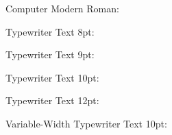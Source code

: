 \documentclass[10pt,a4paper]{article}
\newcommand{\Ligature}{%

}
\begin{document}
Computer Modern Roman:\\{\Ligature}

Typewriter Text 8pt:\\{\oltteight \Ligature}

Typewriter Text 9pt:\\{\olttnine \Ligature}

Typewriter Text 10pt:\\{\olttten \Ligature}

Typewriter Text 12pt:\\{\oltttwelve \Ligature}

Variable-Width Typewriter Text 10pt:\\{\olvtt \Ligature}
\end{document}
